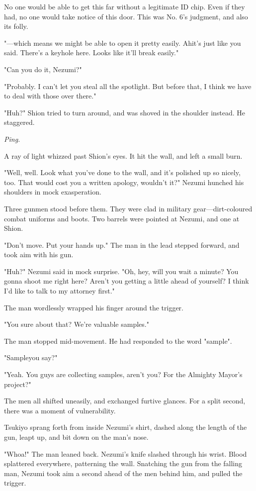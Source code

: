 No one would be able to get this far without a legitimate ID chip. Even
if they had, no one would take notice of this door. This was No. 6's
judgment, and also its folly.

"---which means we might be able to open it pretty easily. Ah\el it's just
like you said. There's a keyhole here. Looks like it'll break easily."

"Can you do it, Nezumi?"

"Probably. I can't let you steal all the spotlight. But before that, I
think we have to deal with those over there."

"Huh?" Shion tried to turn around, and was shoved in the shoulder
instead. He staggered.

\emph{Ping.}

A ray of light whizzed past Shion's eyes. It hit the wall, and left a
small burn.

"Well, well. Look what you've done to the wall, and it's polished up so
nicely, too. That would cost you a written apology, wouldn't it?" Nezumi
hunched his shoulders in mock exasperation.

Three gunmen stood before them. They were clad in military
gear---dirt-coloured combat uniforms and boots. Two barrels were pointed
at Nezumi, and one at Shion.

"Don't move. Put your hands up." The man in the lead stepped forward,
and took aim with his gun.

"Huh?" Nezumi said in mock surprise. "Oh, hey, will you wait a minute?
You gonna shoot me right here? Aren't you getting a little ahead of
yourself? I think I'd like to talk to my attorney first."

The man wordlessly wrapped his finger around the trigger.

"You sure about that? We're valuable samples."

The man stopped mid-movement. He had responded to the word "sample".

"Sample\el you say?"

"Yeah. You guys are collecting samples, aren't you? For the Almighty
Mayor's project?"

The men all shifted uneasily, and exchanged furtive glances. For a split
second, there was a moment of vulnerability.

Tsukiyo sprang forth from inside Nezumi's shirt, dashed along the length
of the gun, leapt up, and bit down on the man's nose.

"Whoa!" The man leaned back. Nezumi's knife slashed through his wrist.
Blood splattered everywhere, patterning the wall. Snatching the gun from
the falling man, Nezumi took aim a second ahead of the men behind him,
and pulled the trigger.

